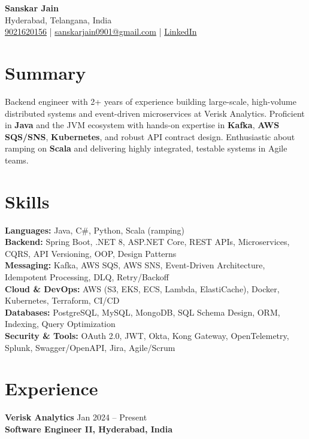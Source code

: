 \documentclass[letterpaper,10pt]{article}
\begin{document}
\begin{center}
    {\LARGE \textbf{Sanskar Jain}} \\
    Hyderabad, Telangana, India \\
    \href{tel:9021620156}{9021620156} \;|\;
    \href{mailto:sanskarjain0901@gmail.com}{sanskarjain0901@gmail.com} \;|\;
    \href{https://www.linkedin.com/in/sanskar-jain0901/}{LinkedIn}
\end{center}

\vspace{3pt}

\section*{Summary}
Backend engineer with 2+ years of experience building large-scale, high-volume distributed systems and event-driven microservices at Verisk Analytics.
Proficient in \textbf{Java} and the JVM ecosystem with hands-on expertise in \textbf{Kafka}, \textbf{AWS SQS/SNS}, \textbf{Kubernetes}, and robust API contract design.
Enthusiastic about ramping on \textbf{Scala} and delivering highly integrated, testable systems in Agile teams.

\section*{Skills}
\textbf{Languages:} Java, C\#, Python, Scala (ramping) \\
\textbf{Backend:} Spring Boot, .NET 8, ASP.NET Core, REST APIs, Microservices, CQRS, API Versioning, OOP, Design Patterns \\
\textbf{Messaging:} Kafka, AWS SQS, AWS SNS, Event-Driven Architecture, Idempotent Processing, DLQ, Retry/Backoff \\
\textbf{Cloud \& DevOps:} AWS (S3, EKS, ECS, Lambda, ElastiCache), Docker, Kubernetes, Terraform, CI/CD \\
\textbf{Databases:} PostgreSQL, MySQL, MongoDB, SQL Schema Design, ORM, Indexing, Query Optimization \\
\textbf{Security \& Tools:} OAuth 2.0, JWT, Okta, Kong Gateway, OpenTelemetry, Splunk, Swagger/OpenAPI, Jira, Agile/Scrum

\section*{Experience}

\textbf{Verisk Analytics} \hfill Jan 2024 -- Present \\
\textbf{Software Engineer II, Hyderabad, India}
\end{document}
